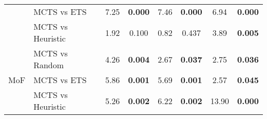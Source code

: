 \begin{tabular}{llcccccc}
                          & MCTS vs ETS       & 7.25              & \textbf{0.000}            & 7.46              & \textbf{0.000}             & 6.94                & \textbf{0.000}              \\
                          & MCTS vs Heuristic   & 1.92              & 0.100            & 0.82              & 0.437             & 3.89                & \textbf{0.005}              \\ \midrule
\multirow{3}{*}{MoF}      & MCTS vs Random    & 4.26              & \textbf{0.004}            & 2.67              & \textbf{0.037}             & 2.75                & \textbf{0.036}              \\
                          & MCTS vs ETS       & 5.86              & \textbf{0.001}            & 5.69              & \textbf{0.001}             & 2.57                & \textbf{0.045}              \\
                          & MCTS vs Heuristic   & 5.26              & \textbf{0.002}            & 6.22              & \textbf{0.002}             & 13.90               & \textbf{0.000}   \\
\bottomrule
\end{tabular}